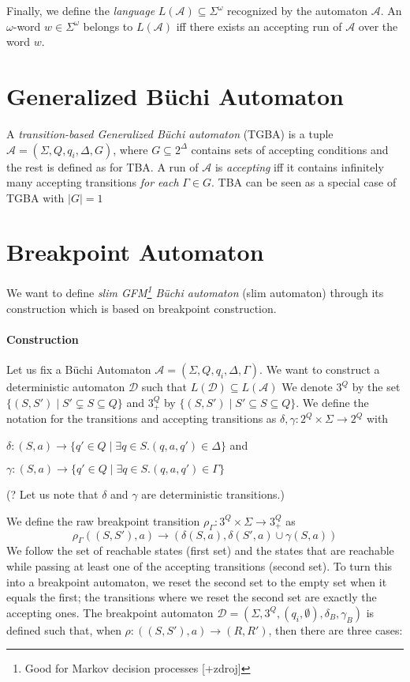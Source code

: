 \documentclass[
	digital
nolof, nolot
]{fithesis3}
\newcommand{\cA}{\mathcal{A}}
\newcommand{\cD}{\mathcal{D}}
\newcommand{\lA}{L(\cA)}
\newcommand{\lD}{L(\cD)}
\begin{document}
			Finally, we define the \emph{language} $\lA \subseteq \Sigma^\omega$ recognized by the automaton $\cA$. An $\omega$-word $w \in \Sigma^\omega$ belongs to $\lA$ iff there exists an accepting run of $\cA$ over the word $w$. 
			
		\section{Generalized Büchi Automaton}
		A \emph{transition-based Generalized Büchi automaton} (TGBA) is a tuple $\cA=(\Sigma, Q, q_i, \Delta, G)$, where $G \subseteq 2^\Delta$ contains sets of accepting conditions and the rest is defined as for TBA. A run of $\cA$ is \emph{accepting} iff it contains infinitely many accepting transitions \emph{for each} $\Gamma \in G$. TBA can be seen as a special case of TGBA with $|G|=1$
		
		\section{Breakpoint Automaton}
			We want to define \emph{slim GFM\footnote{Good for Markov decision processes [+zdroj]} Büchi automaton} (slim automaton) through its construction which is based on breakpoint construction. 
			\paragraph{Construction}
			Let us fix a Büchi Automaton $\cA=(\Sigma, Q, q_i, \Delta, \Gamma)$. 
			We want to construct a deterministic automaton $\cD$ such that $\lD\subseteq \lA$ 
			We denote $3^Q$ by the set $\{(S,S') \mid S'\subsetneq S \subseteq Q\}$ and
			$3^Q_+$ by $\{(S,S') \mid S'\subseteq S \subseteq Q\}$.
			We define the notation for the transitions and accepting transitions as $\delta,\gamma:2^Q \times \Sigma \rightarrow 2^Q$ with
			
			$\delta: (S,a)\rightarrow\{q'\in Q \mid \exists q \in S.(q,a,q') \in \Delta\}$ and
			
			$\gamma: (S,a)\rightarrow\{q'\in Q \mid \exists q \in S.(q,a,q') \in \Gamma\}$
			
			(? Let us note that $\delta$ and $\gamma$ are deterministic transitions.)
			
			We define the raw breakpoint transition
			$\rho_\Gamma \colon 3^Q \times \Sigma \rightarrow 3^Q_+$ as
			\[\rho_\Gamma((S, S'), a) \rightarrow(\delta(S, a), \delta(S',a)\cup \gamma(S, a))\]
			We follow the set of reachable states (first set) and the states that are reachable while passing at least one of the accepting transitions (second set).
			To turn this into a breakpoint automaton, we reset the second set to the empty set when it equals the first; the transitions where we reset the second set are exactly the accepting ones.
			The breakpoint automaton $\cD = (\Sigma, 3^Q, (q_i, \emptyset), \delta_B, \gamma_B)$ is defined such that, when $\rho\colon ((S, S'), a) \rightarrow (R, R')$, then there are three cases:
			
\end{document}
